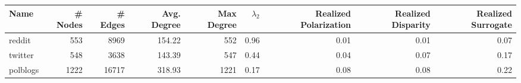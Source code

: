 \begin{tabular}{lrrrrrrrr}
\toprule
Name & # Nodes & # Edges & Avg. Degree & Max Degree & $\lambda_2$ & Realized Polarization & Realized Disparity & Realized Surrogate \\
\midrule
reddit & 553 & 8969 & 154.22 & 552 & 0.96 & 0.01 & 0.01 & 0.07 \\
twitter & 548 & 3638 & 143.39 & 547 & 0.44 & 0.04 & 0.07 & 0.17 \\
polblogs & 1222 & 16717 & 318.93 & 1221 & 0.17 & 0.08 & 0.08 & 0.22 \\
\bottomrule
\end{tabular}

